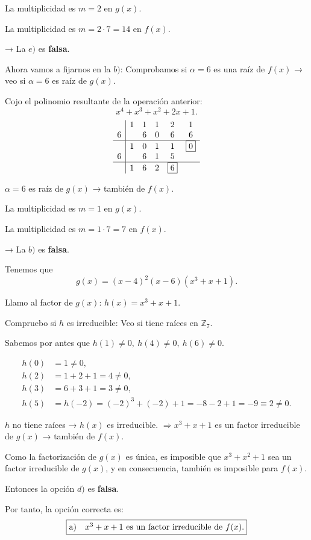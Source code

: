 \documentclass[a4paper,12pt]{article}
\begin{document}
\begin{ejercicioExamen}[title=Ejercicio 5]

La multiplicidad es \(m = 2\) en \( g(x) \).  

La multiplicidad es \(m = 2 \cdot 7 = 14\) en \( f(x) \).  

→ La $e)$ es \textbf{falsa}.

\vspace{1em}

Ahora vamos a fijarnos en la \textbf{$b)$}:  
Comprobamos si \( \alpha = 6 \) es una raíz de \( f(x) \) → veo si \( \alpha = 6 \) es raíz de \( g(x) \).

Cojo el polinomio resultante de la operación anterior:  
\[
x^4 + x^3 + x^2 + 2x + 1.
\]
\[
\begin{array}{c|ccccc}
 & 1 & 1 & 1 & 2 & 1 \\
6 &   & 6 & 0 & 6 & 6 \\
\hline
 & 1 & 0 & 1 & 1 & \boxed{0} \\
6 &   & 6 & 1 & 5 \\
\hline
 & 1 & 6 & 2 & \boxed{6}
\end{array}
\]

\(\alpha = 6\) es raíz de \( g(x) \) → también de \( f(x) \). 

La multiplicidad es \(m = 1\) en \( g(x)\).  

La multiplicidad es \(m = 1 \cdot 7 = 7\) en \( f(x)\).  

→ La $b)$ es \textbf{falsa}.

\medskip
Tenemos que 
\[
g(x) = (x - 4)^2 (x - 6)(x^3 + x + 1).
\]

Llamo al factor de \( g(x) \): \( h(x) = x^3 + x + 1. \)

\medskip
Compruebo si \( h \) es irreducible:  
Veo si tiene raíces en \(\mathbb{Z}_7\).

Sabemos por antes que \( h(1) \neq 0, \ h(4) \neq 0, \ h(6) \neq 0. \)

\[
\begin{aligned}
h(0) &= 1 \neq 0, \\
h(2) &= 1 + 2 + 1 = 4 \neq 0, \\
h(3) &= 6 + 3 + 1 = 3 \neq 0, \\
h(5) &= h(-2) = (-2)^3 + (-2) + 1 = -8 - 2 + 1 = -9 \equiv 2 \neq 0.
\end{aligned}
\]

\(h\) no tiene raíces → \(h(x)\) es irreducible.  
\(\Rightarrow x^3 + x + 1\) es un factor irreducible de \( g(x) \) → también de \( f(x) \).

\medskip
Como la factorización de $g(x)$ es única, es imposible que $x^3 + x^2 + 1$ sea un factor irreducible de $g(x)$, y en consecuencia, también es imposible para $f(x)$.

Entonces la opción $d)$ es \textbf{falsa}.

\medskip
Por tanto, la opción correcta es:
\[
\boxed{$a)$ \quad x^3 + x + 1 \text{ es un factor irreducible de } f(x).}
\]

\end{ejercicioExamen}
\end{document}
